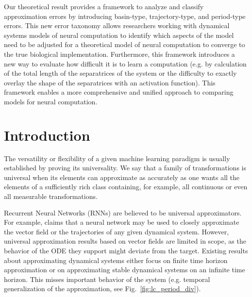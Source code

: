 \documentclass{article}
\theoremstyle{definition}
\theoremstyle{remark}
\newcounter{ct}
\begin{document}
Our theoretical result provides a framework to analyze and classify approximation errors  by introducing basin-type, trajectory-type, and period-type errors. This new error taxonomy allows researchers working with dynamical systems models of neural computation to identify which aspects of the model need to be adjusted for a theoretical model of neural computation to converge to the true biological implementation. Furthermore, this framework introduces a new way to evaluate how difficult it is to learn a computation (e.g. by calculation of the total length of the separatrices of the system or the difficulty to exactly overlay the shape of the separatrices with an activation function). This framework enables a more comprehensive and unified approach to comparing models for neural computation.



\section{Introduction}
The versatility or flexibility of a given machine learning paradigm is usually established by proving its universality.
We say that a family of transformations is universal when its elements can approximate as accurately as one wants all the elements of a sufficiently rich class containing, for example, all continuous or even all measurable transformations.


Recurrent Neural Networks (RNNs) are believed to be universal approximators.
For example, \citet{durstewitz2023reconstructing} claims that 
 a neural network may be used to closely approximate the vector field or the trajectories of any given dynamical system.
However, universal approximation results based on vector fields are limited in scope, as the behavior of the ODE they support might deviate from the target.
Existing results about approximating dynamical systems either focus on finite time horizon approximation or on approximating stable dynamical systems on an infinite time horizon.
This misses important behavior of the system (e.g. temporal generalization of the approximation, see Fig.~\ref{fig:lc_period_div}).
\end{document}
